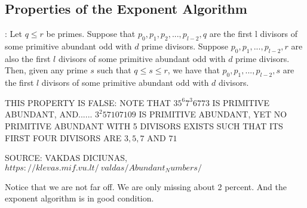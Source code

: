 \documentclass[../paper.tex]{subfiles}
\begin{document}
\subsection{Properties of the Exponent Algorithm}

\begin{theorem}[Property 1]

\end{theorem}

\begin{conj}:
Let $q \leq r$ be primes. Suppose that $p_0, p_1, p_2, ..., 
p_{l-2}, q$ are the first l divisors of some primitive abundant
odd with $d$ prime divisors. Suppose $p_0, p_1, ..., p_{l-2},r$ 
are also the first $l$ divisors of some primitive abundant odd
with $d$ prime divisors. Then, given any prime $s$ such that $q \leq s 
\leq r$, we have that $p_0, p_1,..., p_{l-2}, s$ are the first $l$
divisors of some primitive abundant odd with $d$ divisors.
\end{conj}

THIS PROPERTY IS FALSE:
NOTE THAT $3 5^6 7^3 67 73$ IS PRIMITIVE ABUNDANT,
AND...... $3^2 5 7 107 109$ IS PRIMITIVE ABUNDANT,
YET NO PRIMITIVE ABUNDANT WITH 5 DIVISORS EXISTS SUCH THAT
ITS FIRST FOUR DIVISORS ARE $3,5,7$ AND $71$


SOURCE: VAKDAS DICIUNAS,
$https://klevas.mif.vu.lt/~valdas/Abundant_Numbers/$

Notice that we are not far off. We are only missing about
2 percent. And the exponent algorithm is in good condition.
\end{document}
